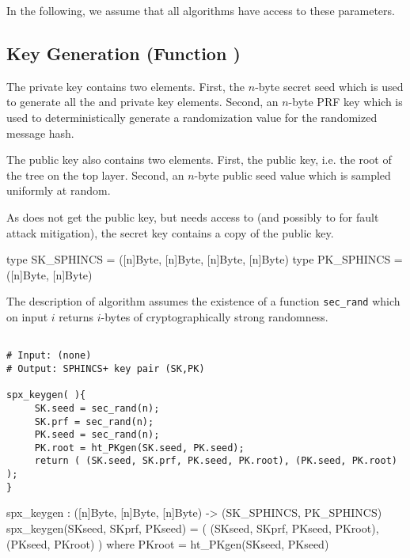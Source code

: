 In the following, we assume that all algorithms have access to these parameters.

\subsection{\spx Key Generation (Function \spxkgen)}

   The \spx private key contains two elements. First, the $n$-byte secret seed
   \sseed which is used to generate all the \wotsp and \fors private key elements.
   Second, an $n$-byte PRF key \skprf which is used to deterministically
   generate a randomization value for the randomized message hash.

   The \spx public key also contains two elements. First, the \hyper public key,
   i.e. the root of the tree on the top layer. Second, an $n$-byte public seed
   value \pseed which is sampled uniformly at random.

   As \spxsign does not get the public key, but needs access to \pseed (and
   possibly to \proot for fault attack mitigation), the \spx secret key contains
   a copy of the public key.

\begin{code}
  type SK_SPHINCS = ([n]Byte, [n]Byte, [n]Byte, [n]Byte)
  type PK_SPHINCS = ([n]Byte, [n]Byte)
\end{code}

   The description of algorithm \spxkgen assumes the existence of a function
   \texttt{sec\_rand} which on input $i$ returns $i$-bytes of cryptographically strong
   randomness.

\begin{lstlisting}[label=alg:spx:pkgen, language=pseudoc,
                   caption=\spxkgen\ -- Generate a \spx key pair.]

# Input: (none)
# Output: SPHINCS+ key pair (SK,PK)

spx_keygen( ){
     SK.seed = sec_rand(n);
     SK.prf = sec_rand(n);
     PK.seed = sec_rand(n);
     PK.root = ht_PKgen(SK.seed, PK.seed);
     return ( (SK.seed, SK.prf, PK.seed, PK.root), (PK.seed, PK.root) );
}

\end{lstlisting}

\begin{code}
  spx_keygen : ([n]Byte, [n]Byte, [n]Byte) -> (SK_SPHINCS, PK_SPHINCS)
  spx_keygen(SKseed, SKprf, PKseed) =
    ( (SKseed, SKprf, PKseed, PKroot), (PKseed, PKroot) )
    where
      PKroot = ht_PKgen(SKseed, PKseed)
\end{code}

